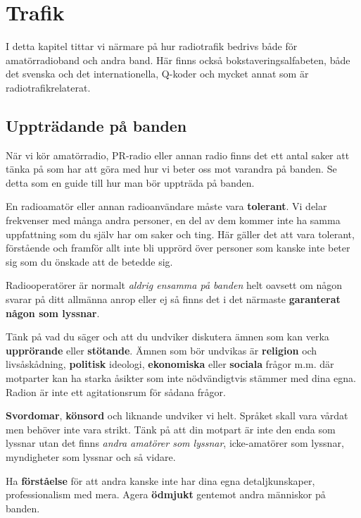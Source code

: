\chapter{Trafik}

I detta kapitel tittar vi närmare på hur radiotrafik bedrivs både för
amatörradioband och andra band. Här finns också
bokstaveringsalfabeten, både det svenska och det internationella,
Q-koder och mycket annat som är radio\-trafik\-relaterat.

\clearpage

\section{Uppträdande på banden}

När vi kör amatörradio, PR-radio eller annan radio finns det ett antal saker
att tänka på som har att göra med hur vi beter oss mot varandra på banden. Se
detta som en guide till hur man bör uppträda på banden.

En radioamatör eller annan radioanvändare måste vara \textbf{tolerant}. Vi
delar frekvenser med många andra personer, en del av dem kommer inte ha samma
uppfattning som du själv har om saker och ting. Här gäller det att vara
tolerant, förstående och framför allt inte bli upprörd över personer som
kanske inte beter sig som du önskade att de betedde sig.

Radiooperatörer är normalt \emph{aldrig ensamma på banden} helt oavsett om
någon svarar på ditt allmänna anrop eller ej så finns det i det närmaste
\textbf{garanterat någon som lyssnar}.

Tänk på vad du säger och att du undviker diskutera ämnen som kan verka
\textbf{upprörande} eller \textbf{stötande}. Ämnen som bör undvikas är
\textbf{religion} och livs\-å\-skå\-d\-ni\-ng, \textbf{politisk} ideologi,
\textbf{ekonomiska} eller \textbf{sociala} frågor m.m. där motparter kan ha
starka åsikter som inte nödvändigtvis stämmer med dina egna. Radion är inte ett
agitationsrum för sådana frågor.

\textbf{Svordomar}, \textbf{könsord} och liknande undviker vi helt. Språket
skall vara vårdat men behöver inte vara strikt. Tänk på att din motpart är inte
den enda som lyssnar utan det finns \textit{andra amatörer som lyssnar},
icke-amatörer som lyssnar, myndigheter som lyssnar och så vidare.

Ha \textbf{förståelse} för att andra kanske inte har dina egna detaljkunskaper,
professionalism med mera. Agera \textbf{ödmjukt} gentemot andra människor på
banden.


